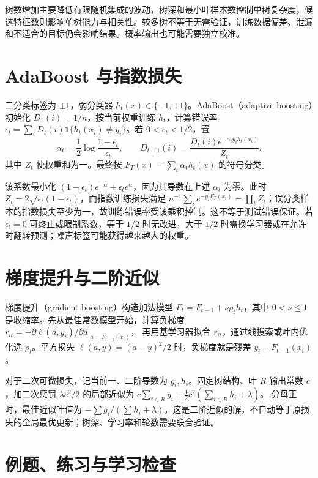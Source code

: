 树数增加主要降低有限随机集成的波动，树深和最小叶样本数控制单树复杂度，候选特征数则影响单树能力与相关性。较多树不等于无需验证，训练数据偏差、泄漏和不适合的目标仍会影响结果。概率输出也可能需要独立校准。

\section{AdaBoost 与指数损失}

二分类标签为 $\pm1$，弱分类器 $h_t(x)\in\{-1,+1\}$。AdaBoost（adaptive boosting）初始化 $D_1(i)=1/n$，按当前权重训练 $h_t$，计算错误率 $\epsilon_t=\sum_iD_t(i)\mathbf1\{h_t(x_i)\ne y_i\}$。若 $0<\epsilon_t<1/2$，置
\begin{equation}
 \alpha_t=\frac12\log\frac{1-\epsilon_t}{\epsilon_t},\qquad
 D_{t+1}(i)=\frac{D_t(i)e^{-\alpha_ty_ih_t(x_i)}}{Z_t}.
 \label{eq:ml-adaboost-update}
\end{equation}
其中 $Z_t$ 使权重和为一。最终按 $F_T(x)=\sum_t\alpha_th_t(x)$ 的符号分类。

该系数最小化 $(1-\epsilon_t)e^{-\alpha}+\epsilon_te^\alpha$，因为其导数在上述 $\alpha_t$ 为零。此时 $Z_t=2\sqrt{\epsilon_t(1-\epsilon_t)}$，而指数训练损失满足 $n^{-1}\sum_i e^{-y_iF_T(x_i)}=\prod_tZ_t$；误分类样本的指数损失至少为一，故训练错误率受该乘积控制。这不等于测试错误保证。若 $\epsilon_t=0$ 可终止或限制系数，等于 $1/2$ 时无改进，大于 $1/2$ 时需换学习器或在允许时翻转预测；噪声标签可能获得越来越大的权重。

\section{梯度提升与二阶近似}

梯度提升（gradient boosting）构造加法模型 $F_t=F_{t-1}+\nu\rho_th_t$，其中 $0<\nu\leq1$ 是收缩率。先从最佳常数模型开始，计算负梯度
$r_{it}=-\partial\ell(a,y_i)/\partial a|_{a=F_{t-1}(x_i)}$，
再用基学习器拟合 $r_{it}$，通过线搜索或叶内优化选 $\rho_t$。平方损失 $\ell(a,y)=(a-y)^2/2$ 时，负梯度就是残差 $y_i-F_{t-1}(x_i)$。

对于二次可微损失，记当前一、二阶导数为 $g_i,h_i$。固定树结构、叶 $R$ 输出常数 $c$，加二次惩罚 $\lambda c^2/2$ 的局部近似为
$c\sum_{i\in R}g_i+\frac12c^2(\sum_{i\in R}h_i+\lambda)$。
分母正时，最佳近似叶值为 $-\sum g_i/(\sum h_i+\lambda)$。这是二阶近似的解，不自动等于原损失的全局最优更新；树深、学习率和轮数需要联合验证。

\section{例题、练习与学习检查}

